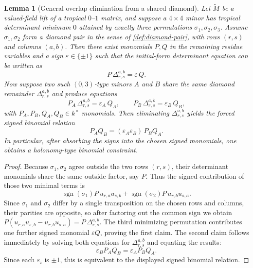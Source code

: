 \documentclass[11pt]{amsart}
\numberwithin{equation}{section}
\theoremstyle{plain}
\newtheorem{lemma}[theorem]{Lemma}
\theoremstyle{definition}
\theoremstyle{remark}
\begin{document}
\begin{lemma}[General overlap-elimination from a shared diamond]
\label{lem:general-diamond-elim}
Let $\widetilde M$ be a valued-field lift of a tropical $0$--$1$ matrix, and suppose a $4\times4$ minor has tropical determinant minimum
$0$ attained by exactly three permutations $\sigma_1,\sigma_2,\sigma_3$. Assume $\sigma_1,\sigma_2$ form a diamond pair in the sense of
\cref{def:diamond-pair}, with rows $(r,s)$ and columns $(a,b)$. Then there exist monomials $P,Q$ in the remaining residue variables and a
sign $\varepsilon\in\{\pm1\}$ such that the initial-form determinant equation can be written as
\[
P\,\Delta_{r,s}^{a,b}=\varepsilon\,Q.
\]
Now suppose two such $(0,3)$-type minors $A$ and $B$ share the same diamond remainder $\Delta_{r,s}^{a,b}$ and produce equations
\[
P_A\,\Delta_{r,s}^{a,b}=\varepsilon_A\,Q_A,
\qquad
P_B\,\Delta_{r,s}^{a,b}=\varepsilon_B\,Q_B,
\]
with $P_A,P_B,Q_A,Q_B\in k^\times$ monomials. Then eliminating $\Delta_{r,s}^{a,b}$ yields the forced signed binomial relation
\[
P_AQ_B=(\varepsilon_A\varepsilon_B)\,P_BQ_A.
\]
In particular, after absorbing the signs into the chosen signed monomials, one obtains a holonomy-type binomial constraint.
\end{lemma}

\begin{proof}
Because $\sigma_1,\sigma_2$ agree outside the two rows $(r,s)$, their determinant monomials share the same outside factor, say $P$.
Thus the signed contribution of those two minimal terms is
\[
\operatorname{sgn}(\sigma_1)P\,u_{r,a}u_{s,b}+\operatorname{sgn}(\sigma_2)P\,u_{r,b}u_{s,a}.
\]
Since $\sigma_1$ and $\sigma_2$ differ by a single transposition on the chosen rows and columns, their parities are opposite, so after
factoring out the common sign we obtain $P(u_{r,a}u_{s,b}-u_{r,b}u_{s,a})=P\,\Delta_{r,s}^{a,b}$. The third minimizing permutation
contributes one further signed monomial $\varepsilon Q$, proving the first claim. The second claim follows immediately by solving both
equations for $\Delta_{r,s}^{a,b}$ and equating the results:
\[
\varepsilon_B P_AQ_B=\varepsilon_A P_BQ_A.
\]
Since each $\varepsilon_i$ is $\pm1$, this is equivalent to the displayed signed binomial relation.
\end{proof}
\end{document}
